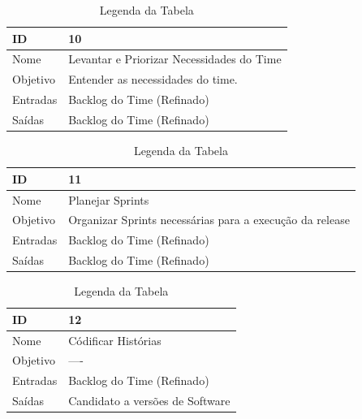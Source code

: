   \begin{table}[H]
    \centering
      \begin{tabular}{| m{5em} | m{10cm} |}
        \hline
        ID       & 10   \\ \hline
        Nome     & Levantar e Priorizar Necessidades do Time  \\ \hline
        Objetivo & Entender as necessidades do time.  \\ \hline
        Entradas & Backlog do Time (Refinado)\\ \hline
        Saídas   & Backlog do Time (Refinado) \\ \hline
      \end{tabular}
      \caption{Legenda da Tabela}
      \label{tabela:atividade10}
  \end{table}

  \begin{table}[H]
    \centering
      \begin{tabular}{| m{5em} | m{10cm} |}
        \hline
        ID       & 11   \\ \hline
        Nome     & Planejar Sprints  \\ \hline
        Objetivo & Organizar Sprints necessárias para a execução da release  \\ \hline
        Entradas & Backlog do Time (Refinado)\\ \hline
        Saídas   & Backlog do Time (Refinado) \\ \hline
      \end{tabular}
      \caption{Legenda da Tabela}
      \label{tabela:atividade11}
  \end{table}

  \begin{table}[H]
    \centering
      \begin{tabular}{| m{5em} | m{10cm} |}
        \hline
        ID       & 12   \\ \hline
        Nome     & Códificar Histórias  \\ \hline
        Objetivo & ----  \\ \hline
        Entradas & Backlog do Time (Refinado)\\ \hline
        Saídas   & Candidato a versões de Software \\ \hline
      \end{tabular}
      \caption{Legenda da Tabela}
      \label{tabela:atividade12}
  \end{table}

